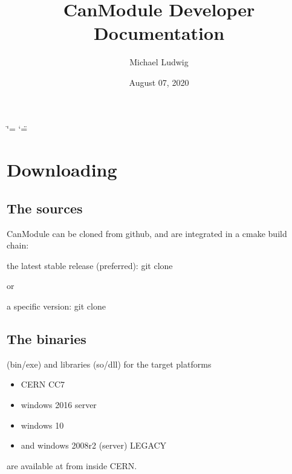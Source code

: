 \documentclass[letterpaper,10pt,english]{sphinxmanual}
\title{CanModule Developer Documentation}
\date{August 07, 2020}
\author{Michael Ludwig}
\begin{document}
\ifdefined\shorthandoff
  \ifnum\catcode`\=\string=\active\shorthandoff{=}\fi
  \ifnum\catcode`\"=\active{}\fi
\fi

\pagestyle{empty}
\sphinxmaketitle
\pagestyle{plain}
\sphinxtableofcontents
\pagestyle{normal}
\label{\detokenize{index::doc}}



\chapter{Downloading}
\label{\detokenize{downloading:downloading}}\label{\detokenize{downloading::doc}}

\section{The sources}
\label{\detokenize{downloading:the-sources}}
CanModule can be cloned from github, and are integrated in a cmake build chain:

the latest stable release (preferred):
git clone  

or

a specific version:
git clone  


\section{The binaries}
\label{\detokenize{downloading:the-binaries}}
(bin/exe) and libraries (so/dll) for the target platforms
\begin{itemize}
\item {} 
CERN CC7

\item {} 
windows 2016 server

\item {} 
windows 10

\item {} 
and windows 2008r2 (server) LEGACY

\end{itemize}

are available at  from inside CERN.
\end{document}
